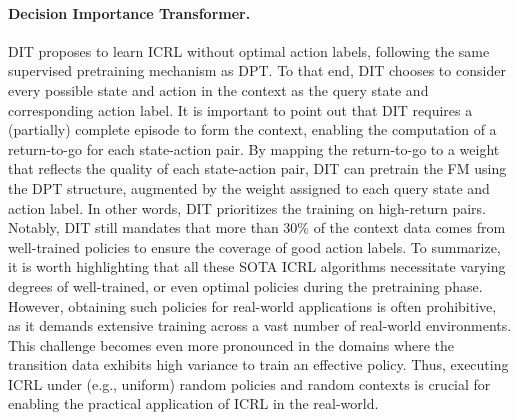 \documentclass[10pt]{article}
\begin{document}
\paragraph{Decision Importance Transformer.}
DIT proposes to learn ICRL without optimal action labels, following the same supervised pretraining mechanism as DPT.
To that end, DIT chooses to consider every possible state and action in the context as the query state and corresponding action label.
It is important to point out that DIT requires a (partially) complete episode to form the context, enabling the computation of a return-to-go for each state-action pair. By mapping the return-to-go to a weight that reflects the quality of each state-action pair, DIT can pretrain the FM using the DPT structure, augmented by the weight assigned to each query state and action label.
In other words, DIT prioritizes the training on high-return pairs.
Notably, DIT still mandates that more than $30\%$ of the context data comes from well-trained policies to ensure the coverage of good action labels.
To summarize, it is worth highlighting that all these SOTA ICRL algorithms necessitate varying degrees of well-trained, or even optimal policies during the pretraining phase.
However, obtaining such policies for real-world applications is often prohibitive, as it demands extensive training across a vast number of real-world environments.
This challenge becomes even more pronounced in the domains where the transition data exhibits high variance to train an effective policy.
Thus, executing ICRL under (e.g., uniform) random policies and random contexts is crucial for enabling the practical application of ICRL in the real-world.
\end{document}
